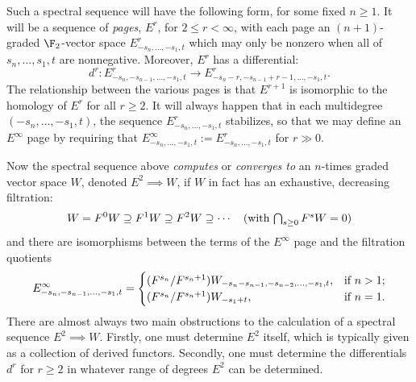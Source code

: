 \documentclass[11pt]{article}
\begin{document}
Such a spectral sequence will have the following form, for some fixed $n\geq1$. It will be a sequence of \emph{pages}, $E^r$, for $2\leq r< \infty$, with each page an $(n+1)$-graded $\F_2$-vector space $E^r_{-s_n,\ldots,-s_1,t}$ which may only be nonzero when all of $s_n,\ldots,s_1,t$ are nonnegative. Moreover, $E^r$ has a differential:
\[d^r:E^r_{-s_n,-s_{n-1},\ldots,-s_1,t}\to E^r_{-s_n-r,-s_{n-1}+r-1,\ldots,-s_1,t}.\]
The relationship between the various pages is that $E^{r+1}$ is isomorphic to the homology of $E^r$ for all $r\geq2$. It will always happen that in each multidegree $(-s_n,\ldots,-s_1,t)$, the sequence $E^r_{-s_n,\ldots,-s_1,t}$ stabilizes, so that we may define an $E^\infty$ page by requiring that $E^\infty_{-s_n,\ldots,-s_1,t}:=E^r_{-s_n,\ldots,-s_1,t}$ for $r\gg0$.

Now the spectral sequence above \emph{computes} or \emph{converges to} an $n$-times graded vector space $W$, denoted $E^2\implies W$, if $W$ in fact has an exhaustive, decreasing filtration:
\[W=F^0W\supseteq F^1W\supseteq F^2W\supseteq \cdots\ \ \ \textup{(with $\textstyle\bigcap_{s\geq0}F^sW=0$)}\]
and there are isomorphisms between the terms of the $E^\infty$ page and the filtration quotients
\[E^\infty_{-s_n,-s_{n-1},\ldots,-s_1,t}=\begin{cases}
(F^{s_n}/F^{s_n+1})W_{-s_n-s_{n-1},-s_{n-2},\ldots,-s_1,t},&\textup{if }n>1;\\
(F^{s_n}/F^{s_n+1})W_{-s_1+t},&\textup{if }n=1.
\end{cases}
\]
There are almost always two main obstructions to the calculation of a spectral sequence $E^2\implies W$. Firstly, one must determine $E^2$ itself, which is typically given as a collection of derived functors. Secondly, one must determine the differentials $d^r$ for $r\geq2$ in whatever range of degrees $E^2$ can be determined.
\end{document}

